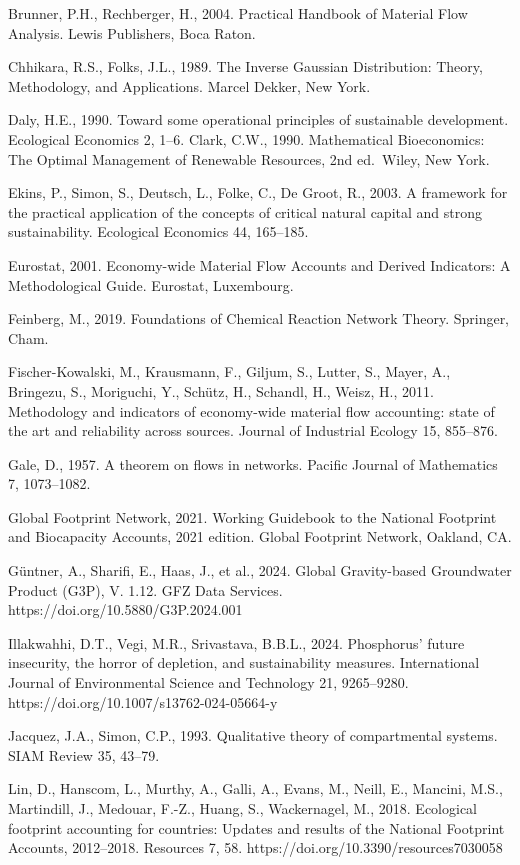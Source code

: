 \documentclass[11pt]{article}
\begin{document}
Brunner, P.H., Rechberger, H., 2004. Practical Handbook of Material Flow
Analysis. Lewis Publishers, Boca Raton.

Chhikara, R.S., Folks, J.L., 1989. The Inverse Gaussian Distribution:
Theory, Methodology, and Applications. Marcel Dekker, New York.

Daly, H.E., 1990. Toward some operational principles of sustainable
development. Ecological Economics 2, 1--6. Clark, C.W., 1990.
Mathematical Bioeconomics: The Optimal Management of Renewable
Resources, 2nd ed.~Wiley, New York.

Ekins, P., Simon, S., Deutsch, L., Folke, C., De Groot, R., 2003. A
framework for the practical application of the concepts of critical
natural capital and strong sustainability. Ecological Economics 44,
165--185.

Eurostat, 2001. Economy-wide Material Flow Accounts and Derived
Indicators: A Methodological Guide. Eurostat, Luxembourg.

Feinberg, M., 2019. Foundations of Chemical Reaction Network Theory.
Springer, Cham.

Fischer-Kowalski, M., Krausmann, F., Giljum, S., Lutter, S., Mayer, A.,
Bringezu, S., Moriguchi, Y., Sch\"utz, H., Schandl, H., Weisz, H., 2011.
Methodology and indicators of economy-wide material flow accounting:
state of the art and reliability across sources. Journal of Industrial
Ecology 15, 855--876.

Gale, D., 1957. A theorem on flows in networks. Pacific Journal of Mathematics 7, 1073--1082.

Global Footprint Network, 2021. Working Guidebook to the National Footprint and Biocapacity Accounts, 2021 edition. Global Footprint Network, Oakland, CA.

G\"untner, A., Sharifi, E., Haas, J., et al., 2024. Global Gravity-based
Groundwater Product (G3P), V. 1.12. GFZ Data Services.
https://doi.org/10.5880/G3P.2024.001

Illakwahhi, D.T., Vegi, M.R., Srivastava, B.B.L., 2024. Phosphorus'
future insecurity, the horror of depletion, and sustainability measures.
International Journal of Environmental Science and Technology 21,
9265--9280. https://doi.org/10.1007/s13762-024-05664-y

Jacquez, J.A., Simon, C.P., 1993. Qualitative theory of compartmental
systems. SIAM Review 35, 43--79.

Lin, D., Hanscom, L., Murthy, A., Galli, A., Evans, M., Neill, E.,
Mancini, M.S., Martindill, J., Medouar, F.-Z., Huang, S., Wackernagel,
M., 2018. Ecological footprint accounting for countries: Updates and
results of the National Footprint Accounts, 2012--2018. Resources 7, 58.
https://doi.org/10.3390/resources7030058
\end{document}
